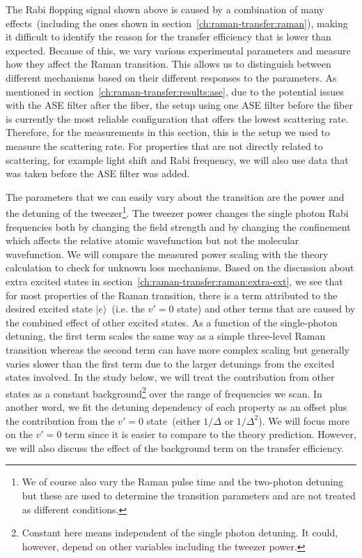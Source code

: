 The Rabi flopping signal shown above is caused by a combination of
many effects~(including the ones shown in section~\ref{ch:raman-transfer:raman}),
making it difficult to identify the reason for the transfer efficiency
that is lower than expected.
Because of this, we vary various experimental parameters
and measure how they affect the Raman transition.
This allows us to distinguish between different mechanisms based
on their different responses to the parameters.
As mentioned in section~\ref{ch:raman-transfer:results:ase},
due to the potential issues with the ASE filter after the fiber,
the setup using one ASE filter before the fiber is currently the most reliable configuration
that offers the lowest scattering rate.
Therefore, for the measurements in this section,
this is the setup we used to measure the scattering rate.
For properties that are not directly related to scattering,
for example light shift and Rabi frequency,
we will also use data that was taken before the ASE filter was added.

The parameters that we can easily vary about the transition
are the power and the detuning of the tweezer\footnote{
  We of course also vary the Raman pulse time and the two-photon detuning
  but these are used to determine the transition parameters
  and are not treated as different conditions.}.
The tweezer power changes the single photon Rabi frequencies
both by changing the field strength and by changing the confinement
which affects the relative atomic wavefunction but not the molecular wavefunction.
We will compare the measured power scaling with the theory calculation
to check for unknown loss mechanisms.
Based on the discussion about extra excited states
in section~\ref{ch:raman-transfer:raman:extra-ext},
we see that for most properties of the Raman transition,
there is a term attributed to
the desired excited state $|e\rangle$~(i.e. the $v'=0$ state)
and other terms that are caused by the combined effect of other excited states.
As a function of the single-photon detuning,
the first term scales the same way as a simple three-level Raman transition
whereas the second term can have more complex scaling but generally varies slower
than the first term due to the larger detunings from the excited states involved.
In the study below, we will treat the contribution from other states
as a constant background\footnote{
  Constant here means independent of the single photon detuning.
  It could, however, depend on other variables including the tweezer power.}
over the range of frequencies we scan.
In another word, we fit the detuning dependency of each property
as an offset plus the contribution from the $v'=0$ state~(either $1/\Delta$ or $1/\Delta^2$).
We will focus more on the $v'=0$ term since it is easier to compare to the theory prediction.
However, we will also discuss the effect of the background term on the transfer efficiency.

